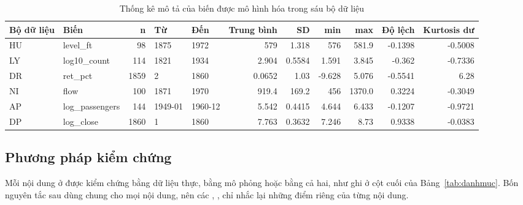 \begin{table}[H]
\centering\scriptsize
\caption{Thống kê mô tả của biến được mô hình hóa trong sáu bộ dữ liệu}\label{tab:tab_eda_descriptive}
\begin{adjustbox}{max width=\linewidth}
\begin{tabular}{|l|l|r|l|l|r|r|r|r|r|r|}
\toprule
Bộ dữ liệu & Biến & n & Từ & Đến & Trung bình & SD & min & max & Độ lệch & Kurtosis dư \\
\midrule
HU & level\_ft & 98 & 1875 & 1972 & 579 & 1.318 & 576 & 581.9 & -0.1398 & -0.5008 \\
LY & log10\_count & 114 & 1821 & 1934 & 2.904 & 0.5584 & 1.591 & 3.845 & -0.362 & -0.7336 \\
DR & ret\_pct & 1859 & 2 & 1860 & 0.0652 & 1.03 & -9.628 & 5.076 & -0.5541 & 6.28 \\
NI & flow & 100 & 1871 & 1970 & 919.4 & 169.2 & 456 & 1370.0 & 0.3224 & -0.3049 \\
AP & log\_passengers & 144 & 1949-01 & 1960-12 & 5.542 & 0.4415 & 4.644 & 6.433 & -0.1207 & -0.9721 \\
DP & log\_close & 1860 & 1 & 1860 & 7.763 & 0.3632 & 7.246 & 8.73 & 0.9338 & -0.0383 \\
\bottomrule
\end{tabular}
\end{adjustbox}\par{}
\end{table}

\subsection{Phương pháp kiểm chứng}

Mỗi nội dung ở  được kiểm chứng bằng dữ liệu thực, bằng mô phỏng hoặc bằng cả hai, như ghi ở cột cuối của Bảng~\ref{tab:danhmuc}. Bốn nguyên tắc sau dùng chung cho mọi nội dung, nên các , ,  chỉ nhắc lại những điểm riêng của từng nội dung.

